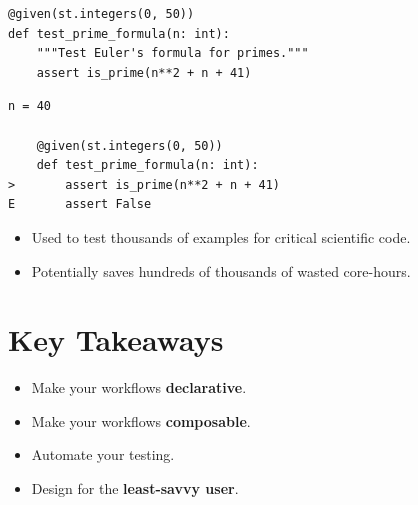 \documentclass[11pt]{article}
\begin{document}
\begin{verbatim}
@given(st.integers(0, 50))
def test_prime_formula(n: int):
    """Test Euler's formula for primes."""
    assert is_prime(n**2 + n + 41)
\end{verbatim}
\begin{verbatim}
n = 40

    @given(st.integers(0, 50))
    def test_prime_formula(n: int):
>       assert is_prime(n**2 + n + 41)
E       assert False
\end{verbatim}
\begin{itemize}
\item Used to test thousands of examples for critical scientific code.
\item Potentially saves hundreds of thousands of wasted core-hours.
\end{itemize}
\section*{Key Takeaways}
\label{sec:org2d0d6e8}
\begin{itemize}
\item Make your workflows \textbf{declarative}.
\item Make your workflows \textbf{composable}.
\item Automate your testing.
\item Design for the \textbf{least-savvy user}.
\end{itemize}
\end{document}

